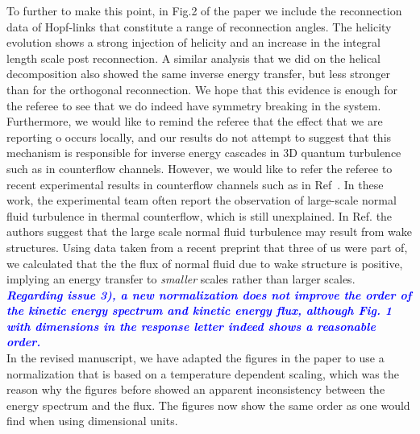 \documentclass[a4paper,10pt]{article}
\def\blue#1{\textcolor{blue}{#1}}
\def\refcomment#1{\textbf{\blue{\emph{#1}}}\\}
\begin{document}
To further to make this point, in Fig.2 of the paper we include the reconnection data of Hopf-links that constitute a range of reconnection angles. The helicity evolution shows a strong injection of helicity and an increase in the integral length scale post reconnection. A similar analysis that we did on the helical decomposition also showed the same inverse energy transfer, but less stronger than for the orthogonal reconnection. We hope that this evidence is enough for the referee to see that we do indeed have symmetry breaking in the system. \\

Furthermore, we would like to remind the referee that the effect that we are reporting o occurs locally, and our results do not attempt to suggest that this mechanism is responsible for inverse energy cascades in 3D quantum turbulence such as in counterflow channels. However, we would like to refer the referee to recent experimental results in counterflow channels such as in Ref~\cite{marakov2015,gao2017,mastracci2019,yui2020}. In these work, the experimental team often report the observation of large-scale normal fluid turbulence in thermal counterflow, which is still unexplained. In Ref.\cite{mastracci2019} the authors suggest that the large scale normal fluid turbulence may result from wake structures. Using data taken from a recent preprint \cite{galantucci2025} that three of us were part of, we calculated that the the flux of normal fluid due to wake structure is positive, implying an energy transfer to \emph{smaller} scales rather than larger scales. \\

\refcomment{Regarding issue 3), a new normalization does not improve
the order of the kinetic energy spectrum and kinetic energy flux,
although Fig. 1 with dimensions in the response letter indeed shows a
reasonable order.}

In the revised manuscript, we have adapted the figures in the paper to use a normalization that is based on a temperature dependent scaling, which was the reason why the figures before showed an apparent inconsistency between the energy spectrum and the flux. The figures now show the same order as one would find when using dimensional units. 
\end{document}
